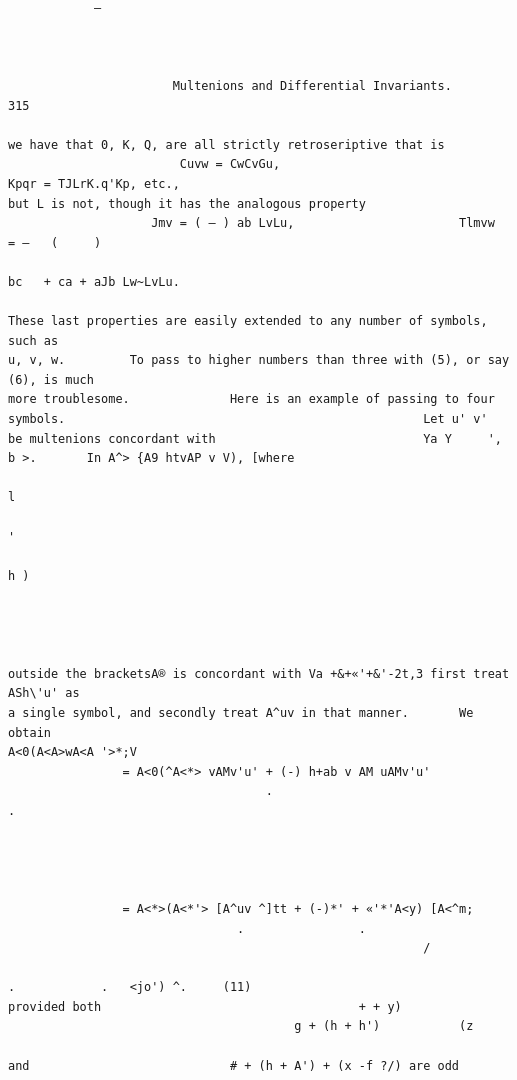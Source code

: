 \documentclass[10pt]{article}
\begin{document}
\begin{verbatim}

            —



                       Multenions and Differential Invariants.                                                                     315

we have that 0, K, Q, are all strictly retroseriptive that is
                        Cuvw = CwCvGu,                                  Kpqr = TJLrK.q'Kp, etc.,
but L is not, though it has the analogous property
                    Jmv = ( — ) ab LvLu,                       Tlmvw           = —   (     )
                                                                                               bc   + ca + aJb Lw~LvLu.

These last properties are easily extended to any number of symbols, such as
u, v, w.         To pass to higher numbers than three with (5), or say (6), is much
more troublesome.              Here is an example of passing to four symbols.                                                  Let u' v'
be multenions concordant with                             Ya Y     ',         b >.       In A^> {A9 htvAP v V), [where
                                                                                                              l
                                                                                                                        '
                                                                                                                       h )




outside the bracketsA® is concordant with Va +&+«'+&'-2t,3 first treat ASh\'u' as
a single symbol, and secondly treat A^uv in that manner.       We obtain
A<0(A<A>wA<A '>*;V
                = A<0(^A<*> vAMv'u' + (-) h+ab v AM uAMv'u'
                                    .                                                      .




                = A<*>(A<*'> [A^uv ^]tt + (-)*' + «'*'A<y) [A<^m;
                                .                .
                                                          /
                                                                                                     .            .   <jo') ^.     (11)
provided both                                    + + y)
                                        g + (h + h')           (z

and                            # + (h + A') + (x -f ?/) are odd


\end{verbatim}
\end{document}
